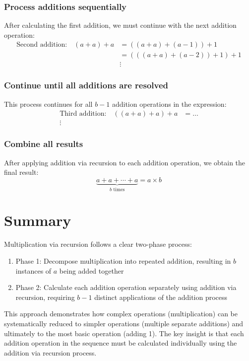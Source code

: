 \documentclass{article}
\begin{document}
\subsubsection{Process additions sequentially}
After calculating the first addition, we must continue with the next addition operation:
\[
    \begin{aligned}
        \text{Second addition:} \quad (a + a) + a & = ((a + a) + (a-1)) + 1       \\
                                                  & = (((a + a) + (a-2)) + 1) + 1 \\
                                                  & \vdots
    \end{aligned}
\]

\subsubsection{Continue until all additions are resolved}
This process continues for all \(b-1\) addition operations in the expression:
\[
    \begin{aligned}
        \text{Third addition:} \quad ((a + a) + a) + a & = \ldots \\
        \vdots
    \end{aligned}
\]

\subsubsection{Combine all results}
After applying addition via recursion to each addition operation, we obtain the final result:
\[
    \underbrace{a + a + \cdots + a}_{b \text{ times}} = a \times b
\]

\section{Summary}
Multiplication via recursion follows a clear two-phase process:
\begin{enumerate}
    \item Phase 1: Decompose multiplication into repeated addition, resulting in \(b\) instances of \(a\) being added together
    \item Phase 2: Calculate each addition operation separately using addition via recursion, requiring \(b-1\) distinct applications of the addition process
\end{enumerate}

This approach demonstrates how complex operations (multiplication) can be systematically reduced to simpler operations (multiple separate additions) and ultimately to the most basic operation (adding 1). The key insight is that each addition operation in the sequence must be calculated individually using the addition via recursion process.
\end{document}

